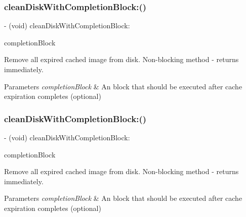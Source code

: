 \subsubsection{\texorpdfstring{clean\+Disk\+With\+Completion\+Block\+:()}{cleanDiskWithCompletionBlock:()}\hspace{0.1cm}{\footnotesize\ttfamily [1/3]}}
{\footnotesize\ttfamily -\/ (void) clean\+Disk\+With\+Completion\+Block\+: \begin{DoxyParamCaption}\item[{(S\+D\+Web\+Image\+No\+Params\+Block)}]{completion\+Block }\end{DoxyParamCaption}}

Remove all expired cached image from disk. Non-\/blocking method -\/ returns immediately. 
\begin{DoxyParams}{Parameters}
{\em completion\+Block} & An block that should be executed after cache expiration completes (optional) \\
\hline
\end{DoxyParams}
\mbox{\label{interface_s_d_image_cache_a1f82c522f4cb0fafdb063291cbcb23d0}} 
\subsubsection{\texorpdfstring{clean\+Disk\+With\+Completion\+Block\+:()}{cleanDiskWithCompletionBlock:()}\hspace{0.1cm}{\footnotesize\ttfamily [2/3]}}
{\footnotesize\ttfamily -\/ (void) clean\+Disk\+With\+Completion\+Block\+: \begin{DoxyParamCaption}\item[{(S\+D\+Web\+Image\+No\+Params\+Block)}]{completion\+Block }\end{DoxyParamCaption}}

Remove all expired cached image from disk. Non-\/blocking method -\/ returns immediately. 
\begin{DoxyParams}{Parameters}
{\em completion\+Block} & An block that should be executed after cache expiration completes (optional) \\
\hline
\end{DoxyParams}
\mbox{\label{interface_s_d_image_cache_a1f82c522f4cb0fafdb063291cbcb23d0}} 
